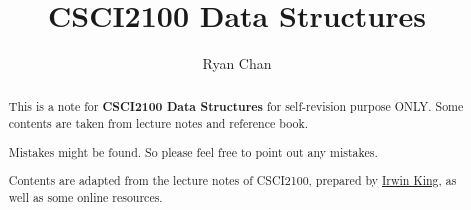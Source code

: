 \documentclass[a4paper]{report}
\author{Ryan Chan}
\title{CSCI2100 Data Structures}
\begin{document}
\setlength\parindent{0pt}

\maketitle

\newpage

\begin{abstract}
	This is a note for \textbf{CSCI2100 Data Structures} for self-revision purpose ONLY. Some contents are taken from lecture notes and reference book.
	
	Mistakes might be found. So please feel free to point out any mistakes.
	
	Contents are adapted from the lecture notes of CSCI2100, prepared by \href{https://www.cse.cuhk.edu.hk/irwin.king/}{Irwin King}, as well as some online resources.
\end{abstract}

\newpage

\tableofcontents

\setlength{\parskip}{5pt}
\end{document}
